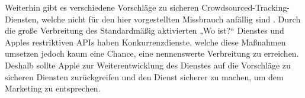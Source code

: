 Weiterhin gibt es verschiedene Vorschläge zu sicheren Crowdsourced-Tracking-Diensten, welche nicht für den hier vorgestellten Missbrauch anfällig sind \cite{Garg_Secure_Tracker,Weller_BLE_Finders}.
Durch die große Verbreitung des Standardmäßig aktivierten „Wo ist?“ Dienstes und Apples restriktiven \acp{API} haben Konkurrenzdienste, welche diese Maßnahmen umsetzen jedoch kaum eine Chance, eine nennenswerte Verbreitung zu erreichen.
Deshalb sollte Apple zur Weiterentwicklung des Dienstes auf die Vorschläge zu sicheren Diensten zurückgreifen und den Dienst sicherer zu machen, um dem Marketing zu entsprechen.